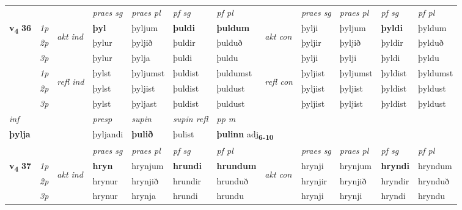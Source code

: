 \begin{longtable}[l]{X>{\footnotesize\itshape}llXXXXlXXXX}
 & &   & \textit{praes sg}  & \textit{praes pl}    & \textit{ pf sg} & \textit{pf pl} & & \textit{praes sg}  & \textit{praes pl}    & \textit{pf sg} & \textit{pf pl }  \\ \cmidrule{4-7} \cmidrule{9-12}
 \multirow{2}{*}{{{\textbf{v{\textsubscript{4}}} \Large{\textbf{36}}}}}  & 1p & \multirow{3}{*}{\begin{turn}{90}\textit{akt ind}\end{turn}} & \textbf{þyl} & þyljum & \textbf{þuldi} & \textbf{þuldum} & \multirow{3}{*}{\begin{turn}{90}\textit{akt con}\end{turn}} &þylji & þyljum & \textbf{þyldi} & þyldum\\*
 & 2p &  &  þylur  & þyljið & þuldir & þulduð & & þyljir & þyljið & þyldir & þylduð \\*
 & 3p &  & þylur & þylja & þuldi & þuldu & & þylji & þylji& þyldi & þyldu \\*
\cmidrule{4-7} \cmidrule{9-12}
 & 1p & \multirow{3}{*}{\begin{turn}{90}\textit{refl ind}\end{turn}}  & þylst & þyljumst & þuldist & þuldumst & \multirow{3}{*}{\begin{turn}{90}\textit{refl con}\end{turn}}  &þyljist & þyljumst & þyldist & þyldumst \\*
 & 2p &  & þylst & þyljist & þuldist & þuldust & &þyljist & þyljist & þyldist & þyldust \\*
 & 3p  & & þylst & þyljast & þuldist & þuldust & & þyljist & þyljist& þyldist & þyldust \\*
\cmidrule{4-7} \cmidrule{9-12}

   {\textit{inf}} & &     & \textit{presp} & \textit{supin} & \textit{supin refl} & \textit{pp m} \\*
  {\textbf{þylja}} & &     & þyljandi &  \textbf{þulið} & þulist & \multicolumn{2}{l}{\textbf{þulinn} adj\textbf{\textsubscript{6-10}}} \\*

\midrule

 & &   & \textit{praes sg}  & \textit{praes pl}    & \textit{ pf sg} & \textit{pf pl} & & \textit{praes sg}  & \textit{praes pl}    & \textit{pf sg} & \textit{pf pl }  \\ \cmidrule{4-7} \cmidrule{9-12}
 \multirow{2}{*}{{{\textbf{v{\textsubscript{4}}} \Large{\textbf{37}}}}}  & 1p & \multirow{3}{*}{\begin{turn}{90}\textit{akt ind}\end{turn}} & \textbf{hryn} & hrynjum & \textbf{hrundi} & \textbf{hrundum} & \multirow{3}{*}{\begin{turn}{90}\textit{akt con}\end{turn}} &hrynji & hrynjum & \textbf{hryndi} & hryndum\\*
 & 2p &  &  hrynur  & hrynjið & hrundir & hrunduð & & hrynjir & hrynjið & hryndir & hrynduð \\*
 & 3p &  & hrynur & hrynja & hrundi & hrundu & & hrynji & hrynji& hryndi & hryndu \\*
\cmidrule{4-7} \cmidrule{9-12}


\end{longtable}

